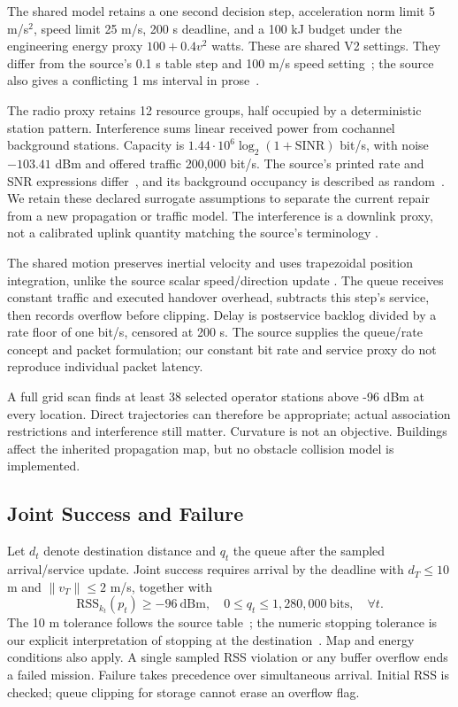 \documentclass[conference]{IEEEtran}
\begin{document}
The shared model retains a one second decision step, acceleration norm limit
5 m/s$^2$, speed limit 25 m/s, 200 s deadline, and a 100 kJ budget under the
engineering energy proxy $100+0.4v^2$ watts. These are shared V2 settings. They differ from the source's 0.1 s table step and 100 m/s speed
setting~\cite[p.~15, Table~3]{thesis}; the source also gives a conflicting
1 ms interval in prose~\cite[p.~14, Sec.~6.1]{thesis}.

The radio proxy retains 12 resource groups, half occupied by a deterministic
station pattern. Interference sums linear received power from cochannel
background stations. Capacity is $1.44\cdot10^6\log_2(1+\mathrm{SINR})$ bit/s,
with noise $-103.41$ dBm and offered traffic 200,000 bit/s. The source's printed
rate and SNR expressions differ~\cite[p.~10, Eqs.~(7)--(8)]{thesis}, and its
background occupancy is described as random~\cite[p.~14, Sec.~6.1]{thesis}.
We retain these declared surrogate assumptions to separate the current repair
from a new propagation or traffic model. The interference is a downlink proxy,
not a calibrated uplink quantity matching the source's terminology
\cite[p.~10, Eq.~(9)]{thesis}.


The shared motion preserves inertial velocity and uses trapezoidal position
integration, unlike the source scalar speed/direction update
\cite[p.~9, Eq.~(2)]{thesis}. The queue receives constant traffic and executed
handover overhead, subtracts this step's service, then records overflow before
clipping. Delay is postservice backlog divided by a rate floor of one bit/s,
censored at 200 s. The source supplies the queue/rate concept and packet
formulation\cite[pp.~9--10, Eqs.~(4)--(6)]{thesis}; our constant bit rate and
service proxy do not reproduce individual packet latency.

A full grid scan finds at least 38 selected operator stations above -96 dBm
at every location. Direct trajectories can therefore be appropriate; actual
association restrictions and interference still matter. Curvature is not an
objective. Buildings affect the inherited propagation map, but no obstacle
collision model is implemented.
\subsection{Joint Success and Failure}
Let $d_t$ denote destination distance and $q_t$ the queue after the sampled
arrival/service update. Joint success requires arrival by the deadline with
$d_T\leq10$ m and $\|v_T\|\leq2$ m/s, together with
\begin{equation}
\mathrm{RSS}_{k_t}(p_t)\geq-96\ \mathrm{dBm},\quad
0\leq q_t\leq1{,}280{,}000\ \mathrm{bits},\quad\forall t.
\end{equation}
The 10 m tolerance follows the source table~\cite[p.~15, Table~3]{thesis}; the
numeric stopping tolerance is our explicit interpretation of stopping at the
destination~\cite[p.~9, Sec.~3.2]{thesis}. Map and energy conditions also apply.
A single sampled RSS violation or any buffer overflow ends a failed mission.
Failure takes precedence over simultaneous arrival. Initial RSS is checked;
queue clipping for storage cannot erase an overflow flag.
\end{document}
